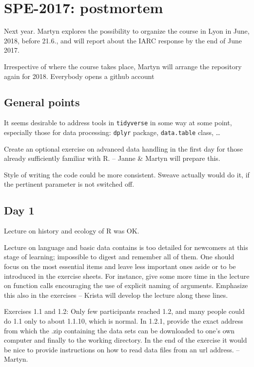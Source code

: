 

\section*{SPE-2017: postmortem}

Next year. Martyn explores the possibility to organize the course 
 in Lyon in June, 2018, before 21.6., and will report about the 
IARC response by the end of June 2017. 

Irrespective of where the course takes place, 
Martyn will arrange the repository again for 2018.
Everybody opens a github account

\subsection*{General points}

It seems desirable to address tools in {\tt tidyverse} in some way at some point, 
especially those for data processing:
 {\tt dplyr} package, {\tt data.table} class, \dots

Create an optional exercise on advanced data handling 
in the first day for those already sufficiently familiar with R. -- Janne \& Martyn will
prepare this.

Style of writing the code could be more consistent. Sweave actually would do it,
if the pertinent parameter is not switched off.  

\subsection*{Day 1}

Lecture on history and ecology of R was OK. 

Lecture on language and basic data 
contains is too detailed for newcomers at this stage of learning; 
impossible to digest and remember all of them. 
One should focus on the most essential items and leave less important ones aside or to be introduced in the exercise sheets.
For instance, give some more time in the lecture on function calls encouraging the use
of explicit naming of arguments. Emphasize this also in the exercises -- Krista
will develop the lecture along these lines.

Exercises 1.1 and 1.2: Only few participants reached 1.2, and many people could do 1.1 only to about 1.1.10, which is normal. In 1.2.1, provide the exact address from which the .zip containing the data sets can be downloaded to one's own computer and finally to the working directory.  
In the end of the exercise it would be nice to provide instructions on how to read data files from an url address. -- Martyn.


